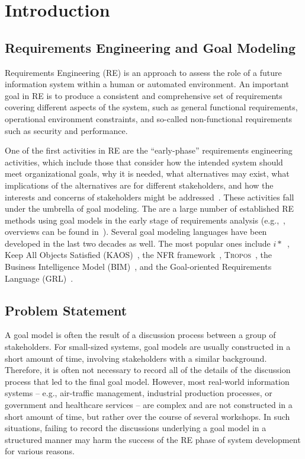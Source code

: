 \section{Introduction}
\label{sect:introduction}

\subsection{Requirements Engineering and Goal Modeling}

Requirements Engineering (RE) is an approach to assess the role of a future information system within a human or automated environment. An important goal in RE is to produce a consistent and comprehensive set of requirements covering different aspects of the system, such as general functional requirements, operational environment constraints, and so-called non-functional requirements such as security and performance. 

One of the first activities in RE are the ``early-phase'' requirements engineering activities, which include those that consider how the intended system should meet organizational goals, why it is needed, what alternatives may exist, what implications of the alternatives are for different stakeholders, and how the interests and concerns of stakeholders might be addressed~\cite{yu1997towards}. These activities fall under the umbrella of goal modeling. The are a large number of established RE methods using goal models in the early stage of requirements analysis (e.g.,~\cite{liu2004designing,donzelli2004goal,dardenne1993goal,chung2012non,castro2002towards}, overviews can be found in~\cite{van2001goal,kavakliL05}). Several goal modeling languages have been developed in the last two decades as well. The most popular ones include $i*$~\cite{Yu:1997:TMR:827255.827807}, Keep All Objects Satisfied (KAOS)~\cite{van2008requirements}, the NFR framework~\cite{chung2012non}, \textsc{Tropos}~\cite{giorgini2005goal}, the Business Intelligence Model (BIM)~\cite{horkoff2014strategic}, and the Goal-oriented Requirements Language (GRL)~\cite{Amyot:2010:EGM:1841349.1841356}.

\subsection{Problem Statement}

A goal model is often the result of a discussion process between a group of stakeholders. For small-sized systems, goal models are usually constructed in a short amount of time, involving stakeholders with a similar background. Therefore, it is often not necessary to record all of the details of the discussion process that led to the final goal model. However, most real-world information systems -- e.g., air-traffic management, industrial production processes, or government and healthcare services -- are complex and are not constructed in a short amount of time, but rather over the course of several workshops. In such situations, failing to record the discussions underlying a goal model in a structured manner may harm the success of the RE phase of system development for various reasons. 

